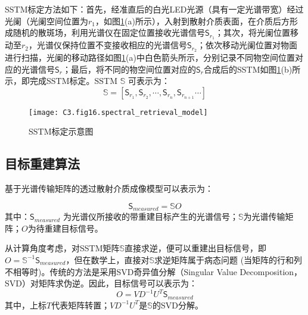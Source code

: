 SSTM标定方法如下：首先，经准直后的白光LED光源（具有一定光谱带宽）经过光阑（光阑空间位置为$r_1$，如图\ref{fig:3.16}(a)所示），入射到散射介质表面，在介质后方形成随机的散斑场，利用光谱仪在固定位置接收光谱信号$\mathsf{S}_{r_{1}}$；其次，将光阑位置移动至$r_2$，光谱仪保持位置不变接收相应的光谱信号$\mathsf{S}_{r_{2}}$；依次移动光阑位置对物面进行扫描，光阑的移动路径如图\ref{fig:3.16}(a)中白色箭头所示，分别记录不同物空间位置对应的光谱信号$\mathsf{S}_{r}$；最后，将不同的物空间位置对应的$\mathsf{S}_{r}$合成后的SSTM如图\ref{fig:3.16}(b)所示，即完成SSTM标定。SSTM $\mathbb{S}$ 可表示为：
\begin{equation}
    \mathbb{S} = [\mathsf{S}_{r_{1}},\mathsf{S}_{r_{2}},\cdots,\mathsf{S}_{r_{n}},\mathsf{S}_{r_{n+1}}\cdots]
\label{eq:wavelength_dependent_3}
\end{equation}

\begin{figure}[htp]
	\centering
	\texttt{[image: C3.fig16.spectral\_retrieval\_model]}
	\caption{SSTM标定示意图}
	\label{fig:3.16}
\end{figure}

\subsection{目标重建算法}
基于光谱传输矩阵的透过散射介质成像模型可以表示为：

\begin{equation}
    \mathsf{S_{\textit{measured}}} =\mathbb{S}O
\label{eq:wavelength_dependent_4}
\end{equation}
其中：$\mathsf{S_{\textit{measured}}}$ 为光谱仪所接收的带重建目标产生的光谱信号；$\mathbb{S}$为光谱传输矩阵；$O$为待重建目标信号。

从计算角度考虑，对SSTM矩阵$\mathbb{S}$直接求逆，便可以重建出目标信号，即 $ O = \mathbb{S}^{-1} \mathsf{S_{\textit{measured}}}$，但在数学上，直接对$\mathbb{S}$求逆矩阵属于病态问题 (当矩阵的行和列不相等时)。传统的方法是采用SVD奇异值分解（Singular Value Decomposition，SVD）对矩阵求伪逆。因此，目标信号可以表示为：
\begin{equation}
  O = VD^{-1}U^{T}\mathsf{S_{\textit{measured}}}
\label{eq:wavelength_dependent_5}
\end{equation}
其中，上标$T$代表矩阵转置；$VD^{-1}U^{T}$是$\mathbb{S}$的SVD分解。

